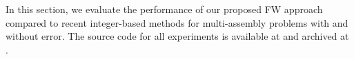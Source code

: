 \documentclass{ecai}
\newcommand{\vvv}{\mathbf{v}}
\newcommand{\vw}{\mathbf{w}}
\newcommand{\Z}{\mathbb{Z}}
\newcommand{\interval}[1]{ [\![  #1 ]\!]}
\begin{document}
In this section, we evaluate the performance of our proposed FW approach compared to recent integer-based methods for multi-assembly problems with and without error.
The source code for all experiments is available at \cite{repo} and archived at \cite{besancon_2025_16033781}.

\end{document}
